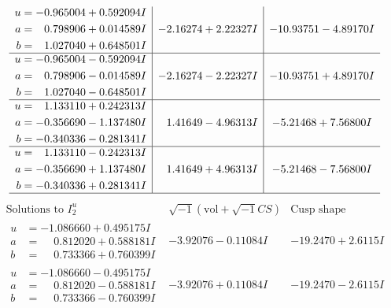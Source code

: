 \documentclass[1p]{elsarticle_modified}
\theoremstyle{definition}
\newcommand{\I}{\sqrt{-1}}
\begin{document}
$$\begin{array}{c|c|c}
\begin{aligned}
u &= -0.965004 + 0.592094 I \\
a &= \phantom{-}0.798906 + 0.014589 I \\
b &= \phantom{-}1.027040 + 0.648501 I\end{aligned}
 & -2.16274 + 2.22327 I & -10.93751 - 4.89170 I \\ \hline\begin{aligned}
u &= -0.965004 - 0.592094 I \\
a &= \phantom{-}0.798906 - 0.014589 I \\
b &= \phantom{-}1.027040 - 0.648501 I\end{aligned}
 & -2.16274 - 2.22327 I & -10.93751 + 4.89170 I \\ \hline\begin{aligned}
u &= \phantom{-}1.133110 + 0.242313 I \\
a &= -0.356690 - 1.137480 I \\
b &= -0.340336 - 0.281341 I\end{aligned}
 & \phantom{-}1.41649 - 4.96313 I & -5.21468 + 7.56800 I \\ \hline\begin{aligned}
u &= \phantom{-}1.133110 - 0.242313 I \\
a &= -0.356690 + 1.137480 I \\
b &= -0.340336 + 0.281341 I\end{aligned}
 & \phantom{-}1.41649 + 4.96313 I & -5.21468 - 7.56800 I\\
 \hline 
 \end{array}$$\newpage$$\begin{array}{c|c|c}  
\text{Solutions to }I^u_{2}& \I (\text{vol} + \sqrt{-1}CS) & \text{Cusp shape}\\
 \hline 
\begin{aligned}
u &= -1.086660 + 0.495175 I \\
a &= \phantom{-}0.812020 + 0.588181 I \\
b &= \phantom{-}0.733366 + 0.760399 I\end{aligned}
 & -3.92076 - 0.11084 I & -19.2470 + 2.6115 I \\ \hline\begin{aligned}
u &= -1.086660 - 0.495175 I \\
a &= \phantom{-}0.812020 - 0.588181 I \\
b &= \phantom{-}0.733366 - 0.760399 I\end{aligned}
 & -3.92076 + 0.11084 I & -19.2470 - 2.6115 I \\ \hline\begin{aligned}

\end{aligned}
\end{array}$$
\end{document}
